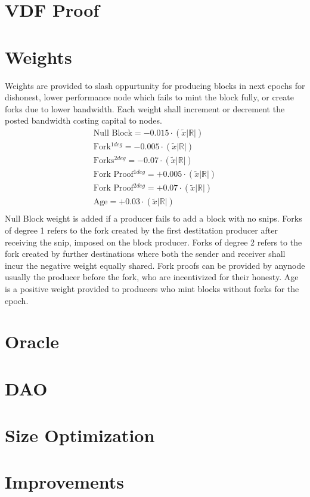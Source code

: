 \documentclass[a4paper,10pt]{article}
\begin{document}

\section{VDF Proof}
\section{Weights}
Weights are provided to slash oppurtunity for producing blocks in next epochs for dishonest, lower performance node which fails to mint the block fully, or create forks due to lower bandwidth. Each weight shall increment or decrement the posted bandwidth costing capital to nodes.
\begin{align*}
\text{Null Block} = -0.015 \cdot (\widetilde{x}|\mathbb{R}|)\\
\text{Fork$^{1deg}$} = -0.005 \cdot (\widetilde{x}|\mathbb{R}|)\\
\text{Forks$^{2deg}$} = -0.07 \cdot (\widetilde{x}|\mathbb{R}|)\\
\text{Fork Proof$^{1deg}$} = +0.005 \cdot (\widetilde{x}|\mathbb{R}|)\\
\text{Fork Proof$^{2deg}$} = +0.07 \cdot (\widetilde{x}|\mathbb{R}|)\\
\text{Age} = +0.03 \cdot (\widetilde{x}|\mathbb{R}|)\\
\end{align*}
Null Block weight is added if a producer fails to add a block with no snips. Forks of degree 1 refers to the fork created by the first destitation producer after receiving the snip, imposed on the block producer. Forks of degree 2 refers to the fork created by further destinations where both the sender and receiver shall incur the negative weight equally shared. Fork proofs can be provided by anynode usually the producer before the fork, who are incentivized for their honesty. Age is a positive weight provided to producers who mint blocks without forks for the epoch.
\section{Oracle}
\section{DAO}
\section{Size Optimization}
\section{Improvements}
\end{document}
